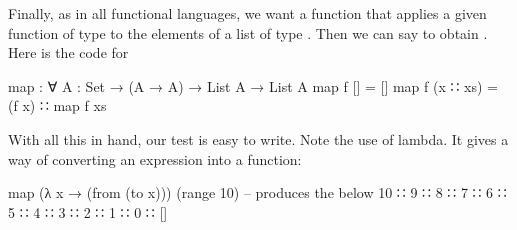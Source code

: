 Finally, as in all functional languages, we want a function  that applies a given function of type  to the elements of a list of type .  Then we can say  to obtain . Here is the code for 


\begin{colored}[elm]
map : ∀ {A : Set} → (A → A) → List A → List A
map f [] = []
map f (x ∷ xs) = (f x) ∷ map f xs
\end{colored}

With all this in hand, our test is easy to write.  Note the use of lambda.  It gives a way of converting an expression into a function:

\begin{colored}[elm]
map (λ x → (from (to x))) (range 10)
-- produces the below
10 ∷ 9 ∷ 8 ∷ 7 ∷ 6 ∷ 5 ∷ 4 ∷ 3 ∷ 2 ∷ 1 ∷ 0 ∷ []
\end{colored}